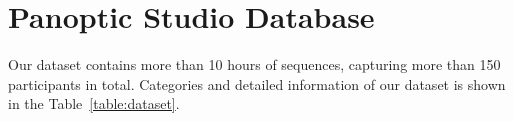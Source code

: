 %

\section{Panoptic Studio Database}
Our dataset contains more than 10 hours of sequences, capturing more than 150 participants in total. Categories and detailed information of our dataset is shown in the Table~\ref{table:dataset}.

